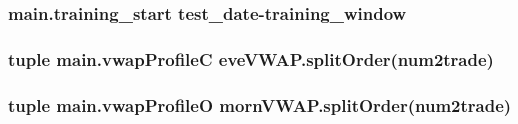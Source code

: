 \hypertarget{namespacemain_a3109aa438d2ce6e6805dbce401dae70e}{
\subsubsection[{training\-\_\-start}]{\setlength{\rightskip}{0pt plus 5cm}main.\-training\-\_\-start test\-\_\-date-\/training\-\_\-window}}\label{namespacemain_a3109aa438d2ce6e6805dbce401dae70e}
\hypertarget{namespacemain_a98bb2a52e5b44a9ceba4f520b3344bd8}{
\subsubsection[{vwap\-Profile\-C}]{\setlength{\rightskip}{0pt plus 5cm}tuple main.\-vwap\-Profile\-C eve\-V\-W\-A\-P.\-split\-Order({\bf num2trade})}}\label{namespacemain_a98bb2a52e5b44a9ceba4f520b3344bd8}
\hypertarget{namespacemain_adb71e21eddaadc4f2572762007577c68}{
\subsubsection[{vwap\-Profile\-O}]{\setlength{\rightskip}{0pt plus 5cm}tuple main.\-vwap\-Profile\-O morn\-V\-W\-A\-P.\-split\-Order({\bf num2trade})}}\label{namespacemain_adb71e21eddaadc4f2572762007577c68}

